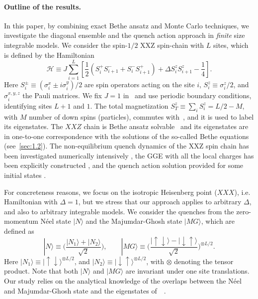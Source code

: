 \documentclass[11pt]{iopart}
\begin{document}
\paragraph*{Outline of the results.} 
In this paper, by combining exact Bethe ansatz and Monte Carlo techniques, we investigate 
the diagonal ensemble and the quench action approach in {\it finite} size integrable models. 
%
We consider the spin-$1/2$ XXZ spin-chain with $L$ sites, which is defined by the Hamiltonian 
%
\begin{equation}
\label{xxx-ham}
{\mathcal H}\equiv J\sum\limits_{i=1}^L\left[\frac{1}{2}(S_i^+S^-_{i+1} 
+S_i^{-}S_{i+1}^+)+\Delta S_i^zS_{i+1}^z-\frac{1}{4}\right].
\end{equation}
%
Here $S^{\pm}_i\equiv (\sigma_i^x\pm i\sigma_i^y)/2$ are spin operators acting on the 
site $i$, $S_i^z\equiv\sigma_i^z/2$, and $\sigma^{x,y,z}_i$ the Pauli matrices. We 
fix $J=1$ in~ and use periodic boundary conditions, identifying sites 
$L+1$ and $1$. The total magnetization $S_{T}^z\equiv\sum_iS_i^z=L/2-M$, with $M$ number 
of down spins (particles), commutes with~, and it is used to label its 
eigenstates. The $XXZ$ chain is Bethe ansatz solvable~\cite{bethe-1931,kor-book} and its eigenstates 
are in one-to-one correspondence with the solutions of the so-called Bethe equations 
(see~\ref{sec:1.2}). 
%
The non-equilibrium quench dynamics of the XXZ spin chain has been investigated numerically intensively \cite{dmcf-06,bar-09,krs-12,cbp-13,cce-15,fagotti-2014},
the GGE with all the local charges has been explicitly constructed \cite{fagotti-2014,pozsgay-2013,fagotti-2013b}, 
and the quench action solution provided for some initial states \cite{pozsgay-2014A,wouters-2014A}. 

For concreteness reasons, we focus on the isotropic Heisenberg point ($XXX$), i.e. Hamiltonian  with $\Delta=1$, 
but we stress that our approach applies to arbitrary $\Delta$, and  also to arbitrary integrable models. 
We consider the quenches from the zero-momentum N\'eel 
state $|N\rangle$ and the Majumdar-Ghosh state $|MG\rangle$, which are defined as  
%
\begin{equation}
\label{psi0}
|N\rangle\equiv\Big(\frac{|N_1\rangle
+|N_2\rangle}{\sqrt{2}}\Big), \qquad 
|MG\rangle\equiv \Big(\frac{|\uparrow\downarrow\rangle-|\downarrow\uparrow\rangle}
{\sqrt{2}}\Big)^{\otimes L/2}. 
\end{equation}
%
Here $|N_1\rangle\equiv |\uparrow\downarrow\rangle^{\otimes L/2}$, and $|N_2\rangle
\equiv |\downarrow\uparrow\rangle^{\otimes L/2}$, with $\otimes$ denoting the tensor 
product. Note that both $|N\rangle$ and $|MG\rangle$ are invariant under one site 
translations. Our study relies on the analytical knowledge of the overlaps between 
the N\'eel and Majumdar-Ghosh state and the eigenstates of~~\cite{
brockmann-2014,brockmann-2014b,brockmann-2014c,pozsgay-2014a,piroli-2014,mazza-2015}. 
\end{document}
